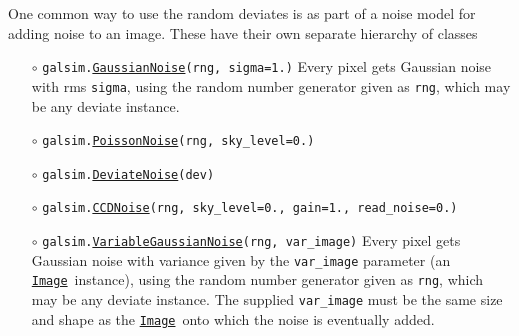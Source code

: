 \documentclass[preprint,10pt]{../../devel/modules/aastex}
\newcommand\Image{\href{http://galsim-developers.github.io/GalSim/classgalsim_1_1image_1_1_image.html}{\texttt{Image}}}
\begin{document}
One common way to use the random deviates is as part of a noise model for adding
noise to an image.  These have their own separate hierarchy of classes

\begin{itemize}
\item[$\circ$] \texttt{galsim.\href{http://galsim-developers.github.io/GalSim/classgalsim_1_1_gaussian_noise.html}{GaussianNoise}(rng, sigma=1.)}  \newline
  {Every pixel gets Gaussian noise with rms \texttt{sigma}, using the
    random number generator given as \texttt{rng}, which may be any deviate instance.}

\item[$\circ$] \texttt{galsim.\href{http://galsim-developers.github.io/GalSim/classgalsim_1_1_poisson_noise.html}{PoissonNoise}(rng, sky\_level=0.)}

\item[$\circ$] \texttt{galsim.\href{http://galsim-developers.github.io/GalSim/classgalsim_1_1_deviate_noise.html}{DeviateNoise}(dev)} 

\item[$\circ$] \texttt{galsim.\href{http://galsim-developers.github.io/GalSim/classgalsim_1_1_c_c_d_noise.html}{CCDNoise}(rng, sky\_level=0., gain=1.,
    read\_noise=0.)}  

\item[$\circ$] \texttt{galsim.\href{http://galsim-developers.github.io/GalSim/classgalsim_1_1noise_1_1_variable_gaussian_noise.html}{VariableGaussianNoise}(rng, var\_image)}  \newline
  {Every pixel gets Gaussian noise with variance given by the \texttt{var\_image} parameter
    (an \Image\ instance), using the
    random number generator given as \texttt{rng}, which may be any deviate instance. 
    The supplied \texttt{var\_image} must be the same size and shape as the \Image\ 
    onto which the noise is eventually added.}


\end{itemize}
\end{document}

